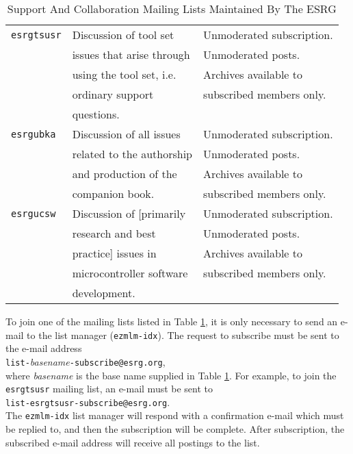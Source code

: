 \begin{table}
\begin{center}
\begin{tabular}{|l|l|l|}
\hline
\texttt{esrgtsusr}   & Discussion of tool set   & Unmoderated subscription. \\
                     & issues that arise through& Unmoderated posts.        \\
                     & using the tool set, i.e. & Archives available to     \\
                     & ordinary support         & subscribed members only.  \\
                     & questions.               &                           \\
\hline
\hline
\texttt{esrgubka}    & Discussion of all issues & Unmoderated subscription. \\
                     & related to the authorship& Unmoderated posts.        \\
                     & and production of the    & Archives available to     \\
                     & companion book.          & subscribed members only.  \\
\hline
\hline
\texttt{esrgucsw}    & Discussion of [primarily & Unmoderated subscription. \\
                     & research and best        & Unmoderated posts.        \\
                     & practice] issues in      & Archives available to     \\
                     & microcontroller software & subscribed members only.  \\
                     & development.             &                           \\
\hline
\end{tabular}
\end{center}
\caption{Support And Collaboration Mailing Lists Maintained By The ESRG}
\label{tbl:csup0:smls0:01}
\end{table}

To join one of the mailing lists listed in 
Table \ref{tbl:csup0:smls0:01}, it is only necessary to 
send an e-mail to the 
list manager (\texttt{ezmlm-idx}).
The request to subscribe must be sent to the e-mail address \\
\longthingindent\texttt{list-}\emph{basename}\texttt{-subscribe@esrg.org},   \\
where \emph{basename} is the base name supplied in 
Table \ref{tbl:csup0:smls0:01}.  For example, to join the
\texttt{esrgtsusr} mailing list, an e-mail must be sent to \\
\longthingindent \texttt{list-esrgtsusr-subscribe@esrg.org}. \\
The 
\texttt{ezmlm-idx} list manager will
respond with a confirmation e-mail which must be replied to, and then
the subscription will be complete.  After subscription, the subscribed
e-mail address will receive all postings to the list.

